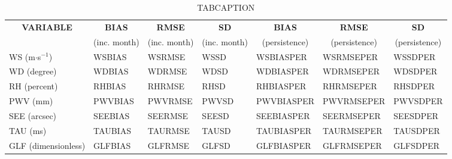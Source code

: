 \begin{table}[]
\begin{center}
\begin{tabular}{|l|l|l|l|l|l|l|}
\hline
\multicolumn{1}{|c|}{\cellcolor[HTML]{C0C0C0}\textbf{VARIABLE}} & \multicolumn{1}{c|}{\cellcolor[HTML]{C0C0C0}\textbf{BIAS}} & \multicolumn{1}{c|}{\cellcolor[HTML]{C0C0C0}\textbf{RMSE}} & \multicolumn{1}{c|}{\cellcolor[HTML]{C0C0C0}\textbf{SD}} & \multicolumn{1}{c|}{\cellcolor[HTML]{C0C0C0}\textbf{BIAS}} & \multicolumn{1}{c|}{\cellcolor[HTML]{C0C0C0}\textbf{RMSE}} & \multicolumn{1}{c|}{\cellcolor[HTML]{C0C0C0}\textbf{SD}}\\
\multicolumn{1}{|c|}{\cellcolor[HTML]{C0C0C0}} & \multicolumn{1}{c|}{\cellcolor[HTML]{C0C0C0}(inc. month)} & \multicolumn{1}{c|}{\cellcolor[HTML]{C0C0C0}(inc. month)} & \multicolumn{1}{c|}{\cellcolor[HTML]{C0C0C0}(inc. month)} & \multicolumn{1}{c|}{\cellcolor[HTML]{C0C0C0}(persistence)} & \multicolumn{1}{c|}{\cellcolor[HTML]{C0C0C0}(persistence)} & \multicolumn{1}{c|}{\cellcolor[HTML]{C0C0C0}(persistence)}\\\hline
\cellcolor[HTML]{C0C0C0}WS (m$\cdot$s$^{-1}$) & WSBIAS  & WSRMSE  & WSSD  & WSBIASPER  & WSRMSEPER  & WSSDPER\\
\cellcolor[HTML]{C0C0C0}WD (degree)           & WDBIAS  & WDRMSE  & WDSD  & WDBIASPER  & WDRMSEPER  & WDSDPER\\
\cellcolor[HTML]{C0C0C0}RH (percent)          & RHBIAS  & RHRMSE  & RHSD  & RHBIASPER  & RHRMSEPER  & RHSDPER\\
\cellcolor[HTML]{C0C0C0}PWV (mm)              & PWVBIAS & PWVRMSE & PWVSD & PWVBIASPER & PWVRMSEPER & PWVSDPER\\
\cellcolor[HTML]{C0C0C0}SEE (arcsec)          & SEEBIAS & SEERMSE & SEESD & SEEBIASPER & SEERMSEPER & SEESDPER\\
\cellcolor[HTML]{C0C0C0}TAU (ms)              & TAUBIAS & TAURMSE & TAUSD & TAUBIASPER & TAURMSEPER & TAUSDPER\\
\cellcolor[HTML]{C0C0C0}GLF (dimensionless)   & GLFBIAS & GLFRMSE & GLFSD & GLFBIASPER & GLFRMSEPER & GLFSDPER\\
\hline
\end{tabular}
\caption{TABCAPTION}
\end{center}
\end{table}

